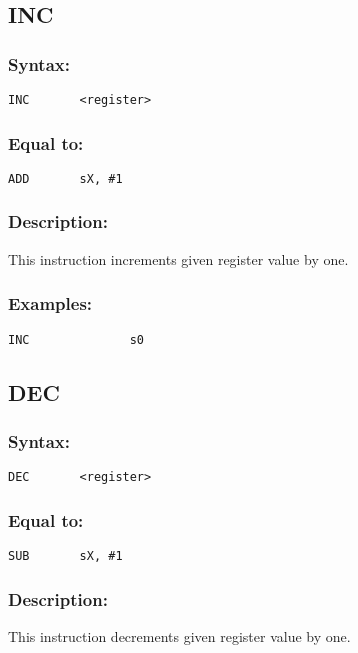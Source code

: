     \subsection{INC}
        \subsubsection{Syntax:}
            {
                \usecodefont
                \verb'INC       <register>'
            }

        \subsubsection{Equal to:}
            {
                \usecodefont
                \verb'ADD       sX, #1'
            }

        \subsubsection{Description:}
            This instruction increments given register value by one.

        \subsubsection{Examples:}
            {
                \usecodefont
                \verb'INC              s0'\\
            }

    \subsection{DEC}
        \subsubsection{Syntax:}
            {
                \usecodefont
                \verb'DEC       <register>'
            }

        \subsubsection{Equal to:}
            {
                \usecodefont
                \verb'SUB       sX, #1'
            }

        \subsubsection{Description:}
            This instruction decrements given register value by one.

